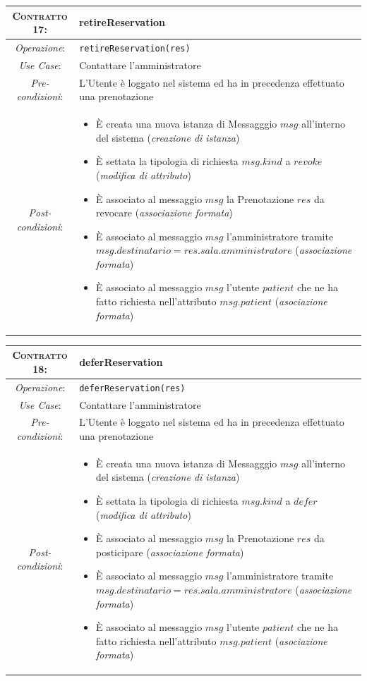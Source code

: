\begin{tabularx}{\columnwidth}{cX}
\toprule
\textsc{Contratto 17}:& \textbf{retireReservation}\\
\midrule
\textit{Operazione}: & 	\texttt{retireReservation(res)}\\
\textit{Use Case}: &	Contattare l'amministratore\\
\textit{Pre-condizioni}: &  L'Utente è loggato nel sistema ed ha in precedenza
			effettuato una prenotazione\\
\textit{Post-condizioni}: & \begin{itemize}
\item È creata una nuova istanza di Messagggio $msg$ all'interno del sistema
	(\textit{creazione di istanza})
\item È settata la tipologia di richiesta $msg.kind$ a $revoke$ (\textit{modifica di
	attributo})
\item È associato al messaggio $msg$ la Prenotazione $res$ da revocare
	(\textit{associazione formata})
\item È associato al messaggio $msg$ l'amministratore tramite $msg.destinatario = res.sala.amministratore$
	(\textit{associazione formata})
\item È associato al messaggio $msg$ l'utente $patient$ che ne ha fatto richiesta
	nell'attributo $msg.patient$ (\textit{asociazione formata})
\end{itemize}\\
\bottomrule
\end{tabularx}
\medskip

\begin{tabularx}{\columnwidth}{cX}
\toprule
\textsc{Contratto 18}:& \textbf{deferReservation}\\
\midrule
\textit{Operazione}: & 	\texttt{deferReservation(res)}\\
\textit{Use Case}: &	Contattare l'amministratore\\
\textit{Pre-condizioni}: &  L'Utente è loggato nel sistema ed ha in precedenza
			effettuato una prenotazione\\
\textit{Post-condizioni}: & \begin{itemize}
\item È creata una nuova istanza di Messagggio $msg$ all'interno del sistema
	(\textit{creazione di istanza})
\item È settata la tipologia di richiesta $msg.kind$ a $defer$ (\textit{modifica di
	attributo})
\item È associato al messaggio $msg$ la Prenotazione $res$ da posticipare
	(\textit{associazione formata})
\item È associato al messaggio $msg$ l'amministratore tramite $msg.destinatario = res.sala.amministratore$
	(\textit{associazione formata})
\item È associato al messaggio $msg$ l'utente $patient$ che ne ha fatto richiesta
	nell'attributo $msg.patient$ (\textit{asociazione formata})
\end{itemize}\\
\bottomrule
\end{tabularx}
\medskip


